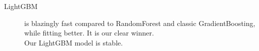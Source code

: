 \documentclass{tikzposter} %
\begin{document}
\begin{columns}
{
\begin{description}
  	\item[LightGBM]  is blazingly fast compared to RandomForest and classic GradientBoosting, while fitting better. It is our clear winner.\\
  	Our LightGBM model is stable.
\end{description}
\vspace{.5cm}
%
%
%
           
}
\end{columns}
\end{document}
